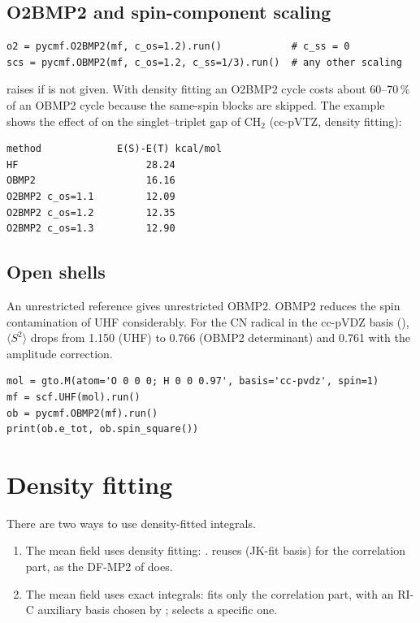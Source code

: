 \subsection{O2BMP2 and spin-component scaling}

\begin{lstlisting}[style=python]
o2 = pycmf.O2BMP2(mf, c_os=1.2).run()            # c_ss = 0
scs = pycmf.OBMP2(mf, c_os=1.2, c_ss=1/3).run()  # any other scaling
\end{lstlisting}

 raises  if  is not given. With
density fitting an O2BMP2 cycle costs about 60--70\,\% of an OBMP2 cycle
because the same-spin blocks are skipped. The example
 shows the effect of  on the
singlet--triplet gap of CH$_2$ (cc-pVTZ, density fitting):

\begin{lstlisting}[style=output]
method             E(S)-E(T) kcal/mol
HF                      28.24
OBMP2                   16.16
O2BMP2 c_os=1.1         12.09
O2BMP2 c_os=1.2         12.35
O2BMP2 c_os=1.3         12.90
\end{lstlisting}

\subsection{Open shells}

An unrestricted reference gives unrestricted OBMP2. OBMP2 reduces the spin
contamination of UHF considerably. For the CN radical in the cc-pVDZ basis
(), $\langle S^2\rangle$ drops from 1.150
(UHF) to 0.766 (OBMP2 determinant) and 0.761 with the amplitude correction.

\begin{lstlisting}[style=python]
mol = gto.M(atom='O 0 0 0; H 0 0 0.97', basis='cc-pvdz', spin=1)
mf = scf.UHF(mol).run()
ob = pycmf.OBMP2(mf).run()
print(ob.e_tot, ob.spin_square())
\end{lstlisting}

\section{Density fitting}
\label{sec:df}

There are two ways to use density-fitted integrals.

\begin{enumerate}
  \item The mean field uses density fitting:
        . \pycmf{} reuses
         (JK-fit basis) for the correlation part, as the
        DF-MP2 of \pyscf{} does.
  \item The mean field uses exact integrals:
         fits only the correlation part,
        with an RI-C auxiliary basis chosen by \pyscf{};
         selects a specific one.
\end{enumerate}

